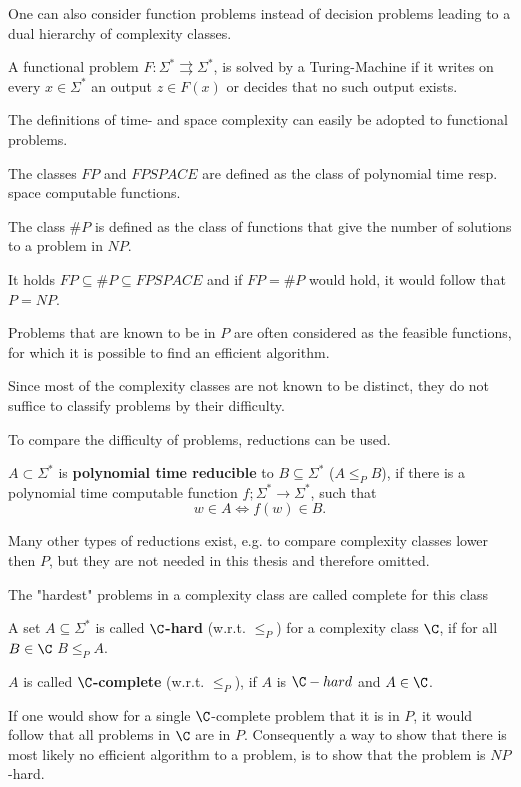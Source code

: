 		One can also consider function problems instead of decision problems
    leading to a dual hierarchy of complexity classes.
		\begin{definition}
      A functional problem $F: \Sigma^* \rightrightarrows \Sigma^*$, is solved
      by a Turing-Machine if it writes on every $x \in \Sigma^*$ an output
      $z \in F(x)$ or decides that no such output exists.  
      
      The definitions of time- and space complexity can easily be adopted to
      functional problems.

      The classes $FP$ and $FPSPACE$ are defined as the class of polynomial
      time resp. space computable functions.  
      
      The class $\#P$ is defined as the class of functions that give the number
      of solutions to a problem in
      $NP$.
    \end{definition}
		It holds $FP \subseteq \#P \subseteq FPSPACE$ and if $FP = \#P$ would hold, it would follow that $P = NP$.
     
		Problems that are known to be in $P$ are often considered as the feasible functions, 
		for which it is possible to find an efficient algorithm. 

    Since most of the complexity classes are not known to be distinct, they do
    not suffice to classify problems by their difficulty.

    To compare the difficulty of problems, reductions can be used.
		\begin{definition}
			$A \subset \Sigma^*$ is \textbf{polynomial time reducible} to $B \subseteq \Sigma^*$ ($A \leq_P B$), 
			if there is a polynomial time computable function $f; \Sigma^* \to \Sigma^*$, such that
			$$ w \in A \Leftrightarrow f(w) \in B.$$
		\end{definition}
		Many other types of reductions exist, e.g. to compare complexity classes
    lower then $P$, but they are not needed in this thesis and therefore
    omitted.

		The "hardest" problems in a complexity class are called complete for this class
		\begin{definition}
			A set $A \subseteq \Sigma^*$ is called \textbf{$\C$-hard} (w.r.t. $\leq_P$) for a complexity class $\C$, if for all $B \in \C$ $B \leq_P A$. 

			$A$ is called \textbf{$\C$-complete} (w.r.t. $\leq_P$), if $A$ is $\C-hard$ and $A \in \C$.  
		\end{definition}
		If one would show for a single $\C$-complete problem that it is in $P$, it would follow that all problems in $\C$ are in $P$.
		Consequently a way to show that there is most likely no efficient algorithm to a problem, is to show that the problem is $NP$-hard.

